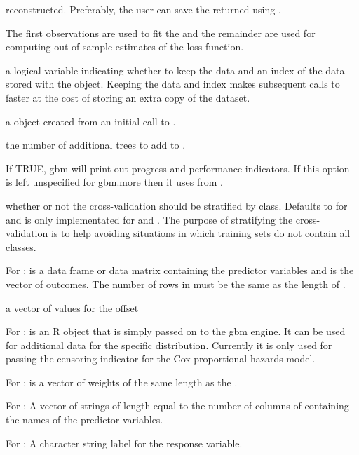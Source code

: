 \documentclass{article}
\begin{document}
\begin{Arguments}
\begin{ldescription}
reconstructed. Preferably, the user can save the returned
 using .
\item[\code{train.fraction}] The first 
observations are used to fit the  and the remainder are used for
computing out-of-sample estimates of the loss function.
\item[\code{keep.data}] a logical variable indicating whether to keep the data and
an index of the data stored with the object. Keeping the data and index makes
subsequent calls to  faster at the cost of storing an
extra copy of the dataset.
\item[\code{object}] a  object created from an initial call to
.
\item[\code{n.new.trees}] the number of additional trees to add to .
\item[\code{verbose}] If TRUE, gbm will print out progress and performance indicators.
If this option is left unspecified for gbm.more then it uses  from
.
\item[\code{class.stratify.cv}] whether or not the cross-validation should be stratified by
class. Defaults to  for  and is only 
implementated for  and . The purpose of stratifying
the cross-validation is to help avoiding situations in which training sets do
not contain all classes.
\item[\code{x, y}] For :  is a data frame or data matrix containing the
predictor variables and  is the vector of outcomes. The number of rows
in  must be the same as the length of .
\item[\code{offset}] a vector of values for the offset
\item[\code{misc}] For :  is an R object that is simply passed on to
the gbm engine. It can be used for additional data for the specific distribution.
Currently it is only used for passing the censoring indicator for the Cox
proportional hazards model.
\item[\code{w}] For :  is a vector of weights of the same
length as the .
\item[\code{var.names}] For : A vector of strings of length equal to the
number of columns of  containing the names of the predictor variables.
\item[\code{response.name}] For : A character string label for the response
variable.
\end{ldescription}
\end{Arguments}
\end{document}
